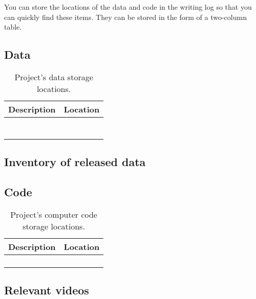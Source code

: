 \documentclass[10pt,letterpaper]{article}
\begin{document}
You can store the locations of the data and code in the writing log so that you can quickly find these items.
They can be stored in the form of a two-column table.

\subsection*{Data}

\begin{table}
    \centering
    \begin{tabular}{cc}
        Description & Location\\
        \toprule
         & \\
         & \\
         & \\
         & \\
         & \\
         & \\
         & \\
         \bottomrule
    \end{tabular}
    \caption{Project's data storage locations.}
    \label{tab:my_label}
\end{table}

\subsection*{Inventory of released data}

\subsection*{Code}


\begin{table}
    \centering
    \begin{tabular}{cc}
        Description & Location\\
        \toprule
         & \\
         & \\
         & \\
         & \\
         \bottomrule
    \end{tabular}
    \caption{Project's computer code storage locations.}
    \label{tab:my_label}
\end{table}



\subsection*{Relevant videos}
\end{document}
